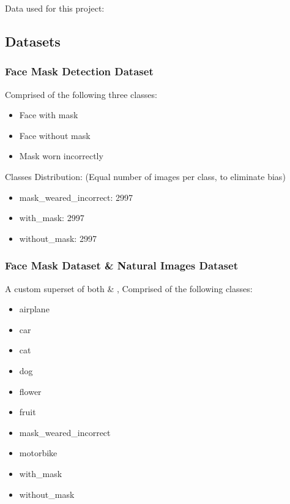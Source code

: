 Data used for this project:
\subsection{Datasets}
    \subsubsection{Face Mask Detection Dataset \cite{face-mask-detection}}
        Comprised of the following three classes:
        \begin{itemize}
            \item Face with mask
            \item Face without mask
            \item Mask worn incorrectly
        \end{itemize}

        Classes Distribution: (Equal number of images per class, to eliminate bias)
        \begin{itemize}
            \item mask\_weared\_incorrect: 2997
            \item with\_mask: 2997
            \item without\_mask: 2997
        \end{itemize}


    \subsubsection{Face Mask Dataset \cite{face-mask-detection} \&  Natural Images Dataset \cite{natural-images}}
        A custom superset of both \cite{face-mask-detection} \&  \cite{natural-images}, Comprised of the following classes:
        \begin{itemize}
            \item airplane
            \item car
            \item cat
            \item dog
            \item flower
            \item fruit
            \item mask\_weared\_incorrect
            \item motorbike
            \item with\_mask
            \item without\_mask
        \end{itemize}


